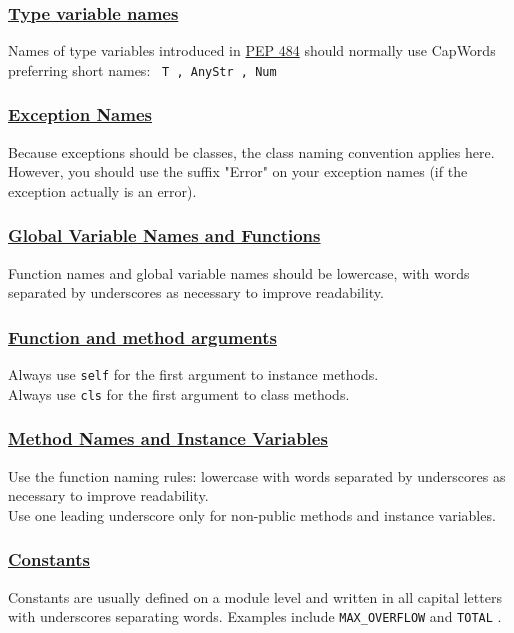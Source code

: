 \documentclass[a4paper]{report}
\begin{document}
\subsubsection{\href{https://www.python.org/dev/peps/pep-0008/\#type-variable-names}{Type variable names}}
Names of type variables introduced in \href{https://www.python.org/dev/peps/pep-0484/}{PEP 484} should normally use CapWords preferring short names: \verb| T , AnyStr , Num|

\subsubsection{\href{https://www.python.org/dev/peps/pep-0008/\#exception-names}{Exception Names}}
Because exceptions should be classes, the class naming convention applies here. However, you should use the suffix "Error" on your exception names (if the exception actually is an error).

\subsubsection{\href{https://www.python.org/dev/peps/pep-0008/\#global-variable-names}{Global Variable Names and Functions}}
Function names and global variable names should be lowercase, with words separated by underscores as necessary to improve readability.

\subsubsection{\href{https://www.python.org/dev/peps/pep-0008/\#function-and-method-arguments}{Function and method arguments}}
Always use \verb|self| for the first argument to instance methods.\\
Always use \verb|cls| for the first argument to class methods.

\subsubsection{\href{https://www.python.org/dev/peps/pep-0008/\#method-names-and-instance-variables}{Method Names and Instance Variables}}
Use the function naming rules: lowercase with words separated by underscores as necessary to improve readability.\\
Use one leading underscore only for non-public methods and instance variables.

\subsubsection{\href{https://www.python.org/dev/peps/pep-0008/\#constants}{Constants}}
Constants are usually defined on a module level and written in all capital letters with underscores separating words. Examples include \verb|MAX_OVERFLOW| and \verb|TOTAL| .
\end{document}
